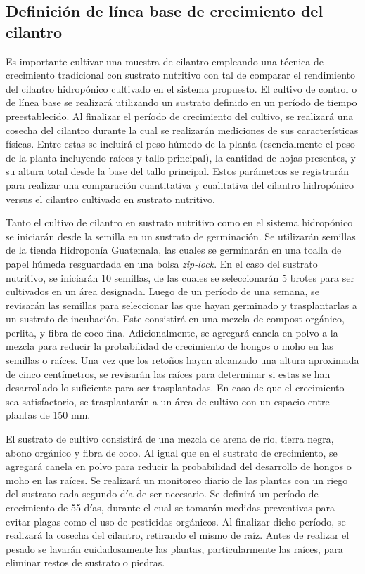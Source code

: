 \subsection*{Definición de línea base de crecimiento del cilantro}
Es importante cultivar una muestra de cilantro empleando una técnica de crecimiento tradicional con sustrato nutritivo con tal de comparar el rendimiento del cilantro hidropónico cultivado en el sistema propuesto. El cultivo de control o de línea base se realizará utilizando un sustrato definido en un período de tiempo preestablecido. Al finalizar el período de crecimiento del cultivo, se realizará una cosecha del cilantro durante la cual se realizarán mediciones de sus características físicas. Entre estas se incluirá el peso húmedo de la planta (esencialmente el peso de la planta incluyendo raíces y tallo principal), la cantidad de hojas presentes, y su altura total desde la base del tallo principal. Estos parámetros se registrarán para realizar una comparación cuantitativa y cualitativa del cilantro hidropónico versus el cilantro cultivado en sustrato nutritivo.

Tanto el cultivo de cilantro en sustrato nutritivo como en el sistema hidropónico se iniciarán desde la semilla en un sustrato de germinación. Se utilizarán semillas de la tienda Hidroponía Guatemala, las cuales se germinarán en una toalla de papel húmeda resguardada en una bolsa \textit{zip-lock}. En el caso del sustrato nutritivo, se iniciarán 10 semillas, de las cuales se seleccionarán 5 brotes para ser cultivados en un área designada. Luego de un período de una semana, se revisarán las semillas para seleccionar las que hayan germinado y trasplantarlas a un sustrato de incubación. Este consistirá en una mezcla de compost orgánico, perlita, y fibra de coco fina. Adicionalmente, se agregará canela en polvo a la mezcla para reducir la probabilidad de crecimiento de hongos o moho en las semillas o raíces. Una vez que los retoños hayan alcanzado una altura aproximada de cinco centímetros, se  revisarán las raíces para determinar si estas se han desarrollado lo suficiente para ser trasplantadas. En caso de que el crecimiento sea satisfactorio, se trasplantarán a un área de cultivo con un espacio entre plantas de 150 mm. 

El sustrato de cultivo consistirá de una mezcla de arena de río, tierra negra, abono orgánico y fibra de coco. Al igual que en el sustrato de crecimiento, se agregará canela en polvo para reducir la probabilidad del desarrollo de hongos o moho en las raíces. Se realizará un monitoreo diario de las plantas con un riego del sustrato cada segundo día de ser necesario. Se definirá un período de crecimiento de 55 días, durante el cual se tomarán medidas preventivas para evitar plagas como el uso de pesticidas orgánicos. Al finalizar dicho período, se realizará la cosecha del cilantro, retirando el mismo de raíz. Antes de realizar el pesado se lavarán cuidadosamente las plantas, particularmente las raíces, para eliminar restos de sustrato o piedras.


